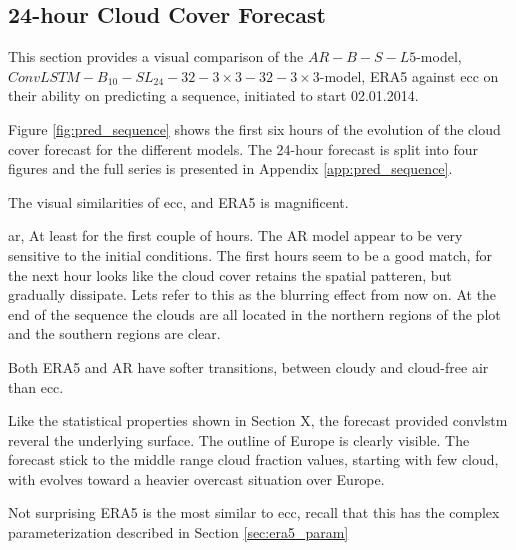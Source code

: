 \subsection{24-hour Cloud Cover Forecast}
This section provides a visual comparison of the $AR-B-S-L5$-model, $ConvLSTM-B_{10}-SL_{24}-32-3\times3-32-3 \times3$-model, ERA5 against \acrshort{ecc} on their ability on predicting a sequence, initiated to start 02.01.2014. 

Figure \ref{fig:pred_sequence} shows the first six hours of the evolution of the cloud cover forecast for the different models. The 24-hour forecast is split into four figures and the full series is presented in Appendix \ref{app:pred_sequence}. 

The visual similarities of \acrshort{ecc}, and ERA5 is magnificent. 

\acrshort{ar}, At least for the first couple of hours. The AR model appear to be very sensitive to the initial conditions. The first hours seem to be a good match, for the next hour looks like the cloud cover retains the spatial patteren, but gradually dissipate. Lets refer to this as the blurring effect from now on. At the end of the sequence the clouds are all located in the northern regions of the plot and the southern regions are clear. 

Both ERA5 and AR have softer transitions, between cloudy and cloud-free air than \acrshort{ecc}.

Like the statistical properties shown in Section X, the forecast provided \acrshort{convlstm} reveral the underlying surface. The outline of Europe is clearly visible. The forecast stick to the middle range cloud fraction values, starting with few cloud, with evolves toward a heavier overcast situation over Europe. 

Not surprising ERA5 is the most similar to \acrshort{ecc}, recall that this has the complex parameterization described in Section \ref{sec:era5_param}


